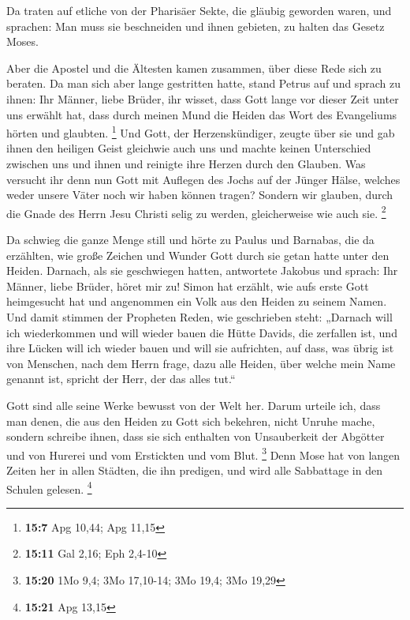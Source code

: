  Da traten auf etliche von der Pharisäer Sekte, die
gläubig geworden waren, und sprachen: Man muss sie beschneiden und ihnen
gebieten, zu halten das Gesetz Moses.

 Aber die Apostel und die Ältesten kamen zusammen, über
diese Rede sich zu beraten.  Da man sich aber lange
gestritten hatte, stand Petrus auf und sprach zu ihnen: Ihr Männer,
liebe Brüder, ihr wisset, dass Gott lange vor dieser Zeit unter uns
erwählt hat, dass durch meinen Mund die Heiden das Wort des Evangeliums
hörten und glaubten. \footnote{\textbf{15:7} Apg 10,44; Apg 11,15}
 Und Gott, der Herzenskündiger, zeugte über sie und gab
ihnen den heiligen Geist gleichwie auch uns  und machte
keinen Unterschied zwischen uns und ihnen und reinigte ihre Herzen durch
den Glauben.  Was versucht ihr denn nun Gott mit Auflegen
des Jochs auf der Jünger Hälse, welches weder unsere Väter noch wir
haben können tragen?  Sondern wir glauben, durch die
Gnade des Herrn Jesu Christi selig zu werden, gleicherweise wie auch
sie. \footnote{\textbf{15:11} Gal 2,16; Eph 2,4-10}

 Da schwieg die ganze Menge still und hörte zu Paulus und
Barnabas, die da erzählten, wie große Zeichen und Wunder Gott durch sie
getan hatte unter den Heiden.  Darnach, als sie
geschwiegen hatten, antwortete Jakobus und sprach: Ihr Männer, liebe
Brüder, höret mir zu!  Simon hat erzählt, wie aufs erste
Gott heimgesucht hat und angenommen ein Volk aus den Heiden zu seinem
Namen.  Und damit stimmen der Propheten Reden, wie
geschrieben steht:  „Darnach will ich wiederkommen und
will wieder bauen die Hütte Davids, die zerfallen ist, und ihre Lücken
will ich wieder bauen und will sie aufrichten,  auf dass,
was übrig ist von Menschen, nach dem Herrn frage, dazu alle Heiden, über
welche mein Name genannt ist, spricht der Herr, der das alles tut.``

 Gott sind alle seine Werke bewusst von der Welt her.
 Darum urteile ich, dass man denen, die aus den Heiden zu
Gott sich bekehren, nicht Unruhe mache,  sondern schreibe
ihnen, dass sie sich enthalten von Unsauberkeit der Abgötter und von
Hurerei und vom Erstickten und vom Blut. \footnote{\textbf{15:20} 1Mo
  9,4; 3Mo 17,10-14; 3Mo 19,4; 3Mo 19,29}  Denn Mose hat
von langen Zeiten her in allen Städten, die ihn predigen, und wird alle
Sabbattage in den Schulen gelesen. \footnote{\textbf{15:21} Apg 13,15}

